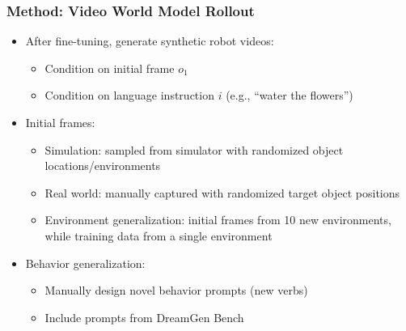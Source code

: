 \documentclass{beamer}
\begin{document}
\begin{frame}
  \frametitle{Method: Video World Model Rollout}
  \small
  \begin{itemize}
    \item After fine-tuning, generate synthetic robot videos:
      \begin{itemize}
        \item Condition on initial frame $o_1$
        \item Condition on language instruction $i$ (e.g., ``water the flowers'')
      \end{itemize}
    \item Initial frames:
      \begin{itemize}
        \item Simulation: sampled from simulator with randomized object locations/environments
        \item Real world: manually captured with randomized target object positions
        \item Environment generalization: initial frames from 10 new environments, while training data from a single environment
      \end{itemize}
    \item Behavior generalization:
      \begin{itemize}
        \item Manually design novel behavior prompts (new verbs)
        \item Include prompts from DreamGen Bench
      \end{itemize}
  \end{itemize}
\end{frame}
\end{document}
